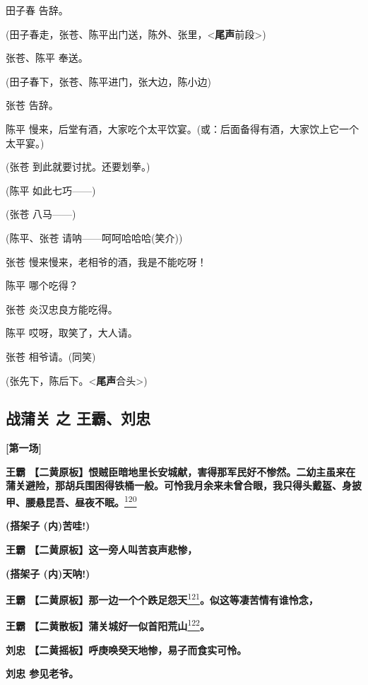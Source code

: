 田子春 告辞。

(田子春走，张苍、陈平出门送，陈外、张里，\textless{}\textbf{尾声}前段\textgreater{})

张苍、陈平 奉送。

(田子春下，张苍、陈平进门，张大边，陈小边)

张苍 告辞。

陈平
慢来，后堂有酒，大家吃个太平饮宴。(或：后面备得有酒，大家饮上它一个太平宴。)

(张苍 到此就要讨扰。还要划拳。)

(陈平 如此七巧------)

(张苍 八马------)

(陈平、张苍 请呐------呵呵哈哈哈(笑介))

张苍 慢来慢来，老相爷的酒，我是不能吃呀！

陈平 哪个吃得？

张苍 炎汉忠良方能吃得。

陈平 哎呀，取笑了，大人请。

张苍 相爷请。(同笑)

(张先下，陈后下。\textless{}\textbf{尾声}合头\textgreater{})

\hypertarget{ux6218ux84b2ux5173-ux4e4b-ux738bux9738ux5218ux5fe0}{%
\subsection{战蒲关 之
王霸、刘忠}\label{ux6218ux84b2ux5173-ux4e4b-ux738bux9738ux5218ux5fe0}}

\textbf{{[}第一场{]}}

\textbf{王霸
【二黄原板】恨贼臣暗地里长安城献，害得那军民好不惨然。二幼主虽来在蒲关避险，那胡兵围困得铁桶一般。可怜我月余来未曾合眼，我只得头戴盔、身披甲、腰悬昆吾、昼夜不眠。}\protect\hyperlink{fn120}{\textsuperscript{120}}

\textbf{(搭架子 (内)苦哇!)}

\textbf{王霸 【二黄原板】这一旁人叫苦哀声悲惨，}

\textbf{(搭架子 (内)天呐!)}

\textbf{王霸
【二黄原板】那一边一个个跌足怨天}\protect\hyperlink{fn121}{\textsuperscript{121}}\textbf{。似这等凄苦情有谁怜念，}

\textbf{王霸
【二黄散板】蒲关城好一似首阳荒山}\protect\hyperlink{fn122}{\textsuperscript{122}}\textbf{。}

\textbf{刘忠 【二黄摇板】呼庚唤癸天地惨，易子而食实可怜。}

\textbf{刘忠 参见老爷。}

